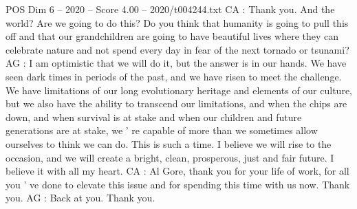 \begin{textsample}{POS Dim 6 – 2020 – Score 4.00 – 2020/t004244.txt}
CA : Thank you.
And the world?
Are we going to do this?
Do you think that humanity is going to pull this off and that our grandchildren are going to have beautiful lives where they can celebrate nature and not spend every day in fear of the next tornado or tsunami?
AG : I am optimistic that we will do it, but the answer is in our hands.
We have seen dark times in periods of the past, and we have risen to meet the challenge.
We have limitations of our long evolutionary heritage and elements of our culture, but we also have the ability to transcend our limitations, and when the chips are down, and when survival is at stake and when our children and future generations are at stake, we ' re capable of more than we sometimes allow ourselves to think we can do.
This is such a time.
I believe we will rise to the occasion, and we will create a bright, clean, prosperous, just and fair future.
I believe it with all my heart.
CA : Al Gore, thank you for your life of work, for all you ' ve done to elevate this issue and for spending this time with us now.
Thank you.
AG : Back at you.
Thank you.

\end{textsample}
